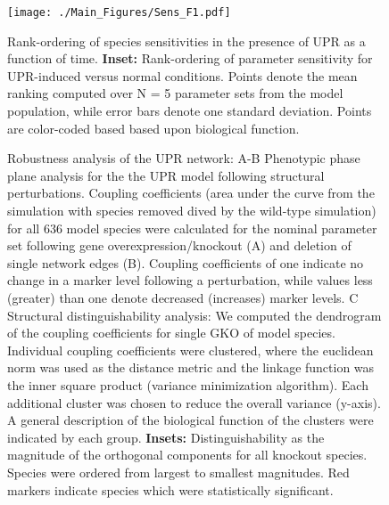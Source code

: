 \documentclass[fleqn,10pt]{wlscirep}
\begin{document}
\begin{figure}\centering
\texttt{[image: ./Main\_Figures/Sens\_F1.pdf]}
	\caption{Rank-ordering of species sensitivities in the presence of UPR as a function of time.
	\textbf{Inset:} Rank-ordering of parameter sensitivity for UPR-induced versus normal conditions.
Points denote the mean ranking computed over N = 5 parameter sets from the model population, while error bars denote one standard deviation. Points are color-coded based based upon biological function.}
	\label{fg:fig5}
\end{figure}

\begin{figure}\centering
{}
	\caption{Robustness analysis of the UPR network: A-B Phenotypic phase plane analysis for the the UPR model following structural perturbations. Coupling coefficients (area under the curve from the simulation with species removed dived by the wild-type simulation) for all 636 model species were calculated for the nominal parameter set following gene overexpression/knockout (A) and deletion of single network edges (B). Coupling coefficients of one indicate no change in a marker level following a perturbation, while values less (greater) than one denote decreased (increases) marker levels. C Structural distinguishability analysis: We computed the dendrogram of the coupling coefficients for single GKO of model species. Individual coupling coefficients were clustered, where the euclidean norm was used as the distance metric and the linkage function was the inner square product (variance minimization algorithm). Each additional cluster was chosen to reduce the overall variance (y-axis). A general description of the biological function of the clusters were indicated by each group. \textbf{Insets:} Distinguishability as the magnitude of the orthogonal components for all knockout species.  Species were ordered from largest to smallest magnitudes.  Red markers indicate species which were statistically significant.}
	\label{fg:robustness_figure}
\end{figure}

\clearpage

\renewcommand\thefigure{S\arabic{figure}}
\renewcommand\thetable{T\arabic{table}}
\renewcommand\thepage{S-\arabic{page}}
\renewcommand\theequation{S\arabic{equation}}

\setcounter{equation}{0}
\setcounter{table}{0}
\setcounter{figure}{0}
\setcounter{page}{1}
\end{document}
